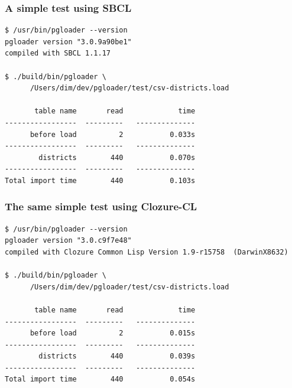 \documentclass{beamer}
\begin{document}
\begin{frame}[fragile]
  \frametitle{A simple test using SBCL}

\begin{verbatim}
$ /usr/bin/pgloader --version
pgloader version "3.0.9a90be1"
compiled with SBCL 1.1.17

$ ./build/bin/pgloader \
      /Users/dim/dev/pgloader/test/csv-districts.load

       table name       read             time
-----------------  ---------   --------------
      before load          2           0.033s
-----------------  ---------   --------------
        districts        440           0.070s
-----------------  ---------   --------------
Total import time        440           0.103s
\end{verbatim}
\end{frame}

\begin{frame}[fragile]
  \frametitle{The same simple test using Clozure-CL}

\begin{verbatim}
$ /usr/bin/pgloader --version
pgloader version "3.0.c9f7e48"
compiled with Clozure Common Lisp Version 1.9-r15758  (DarwinX8632)

$ ./build/bin/pgloader \
      /Users/dim/dev/pgloader/test/csv-districts.load

       table name       read             time
-----------------  ---------   --------------
      before load          2           0.015s
-----------------  ---------   --------------
        districts        440           0.039s
-----------------  ---------   --------------
Total import time        440           0.054s
\end{verbatim}
\end{frame}
\end{document}
